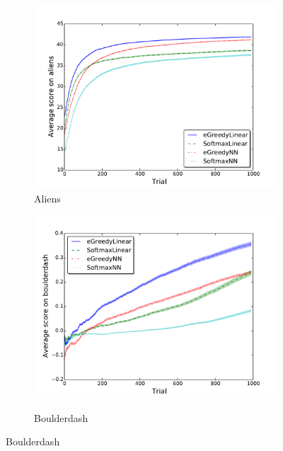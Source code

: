 \documentclass[conference]{IEEEtran}
\begin{document}
\begin{figure}[!t]
	\begin{center}
\begin{subfigure} {\lefig\textwidth}
	\includegraphics[width =\textwidth]{img/aliens_scores}
  \caption{Aliens}
\end{subfigure}\begin{subfigure} {\lefig\textwidth}
	\includegraphics[width = \textwidth]{img/boulderdash_scores}\\
  \caption{Boulderdash}
\end{subfigure}


\end{center}
\end{figure}
\end{document}
